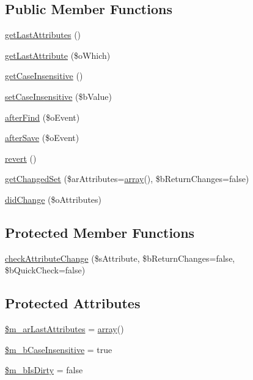 \subsection*{Public Member Functions}
\begin{DoxyCompactItemize}
\item 
\hyperlink{classCPSDeltaChangeBehavior_a8e3ecf06c1d27a09a323e06269bb63a6}{getLastAttributes} ()
\item 
\hyperlink{classCPSDeltaChangeBehavior_a1c2c686604b1f1efb3677252be1b8733}{getLastAttribute} (\$oWhich)
\item 
\hyperlink{classCPSDeltaChangeBehavior_a8a514c6bfa4a35f07eabf5d8d97a0381}{getCaseInsensitive} ()
\item 
\hyperlink{classCPSDeltaChangeBehavior_aae8889c137f252aaab829aeb937d5745}{setCaseInsensitive} (\$bValue)
\item 
\hyperlink{classCPSDeltaChangeBehavior_a22e09b2ab52592b5294616c1c6dc8f97}{afterFind} (\$oEvent)
\item 
\hyperlink{classCPSDeltaChangeBehavior_aef7ee24ff92508fe06889e486940f753}{afterSave} (\$oEvent)
\item 
\hyperlink{classCPSDeltaChangeBehavior_a07ea4bfe78bf9bfa2b9d832d5f7189ba}{revert} ()
\item 
\hyperlink{classCPSDeltaChangeBehavior_abfaf3d0327b6956525bb041380b0b939}{getChangedSet} (\$arAttributes=\hyperlink{list_8php_aa3205d038c7f8feb5c9f01ac4dfadc88}{array}(), \$bReturnChanges=false)
\item 
\hyperlink{classCPSDeltaChangeBehavior_a9dc74e0ca5d3d8445a1e885ba84ae2fa}{didChange} (\$oAttributes)
\end{DoxyCompactItemize}
\subsection*{Protected Member Functions}
\begin{DoxyCompactItemize}
\item 
\hyperlink{classCPSDeltaChangeBehavior_a8d728243619642ee44cfbc3f0e797db2}{checkAttributeChange} (\$sAttribute, \$bReturnChanges=false, \$bQuickCheck=false)
\end{DoxyCompactItemize}
\subsection*{Protected Attributes}
\begin{DoxyCompactItemize}
\item 
\hyperlink{classCPSDeltaChangeBehavior_ad842cf610c9bdd9e1ec9235f3f4ccb88}{\$m\_\-arLastAttributes} = \hyperlink{list_8php_aa3205d038c7f8feb5c9f01ac4dfadc88}{array}()
\item 
\hyperlink{classCPSDeltaChangeBehavior_a8aece4f3a3d397467cae1e8dc6613454}{\$m\_\-bCaseInsensitive} = true
\item 
\hyperlink{classCPSDeltaChangeBehavior_a9edb581e40571436a736bfdfbc9c0a75}{\$m\_\-bIsDirty} = false
\end{DoxyCompactItemize}


